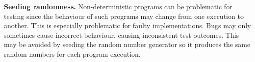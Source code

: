 \textbf{Seeding randomness.}
Non-deterministic programs can be problematic for testing since the behaviour of such programs may change from one execution to another.
This is especially problematic for faulty implementations.
Bugs may only sometimes cause incorrect behaviour, causing inconsistent test outcomes.
This may be avoided by seeding the random number generator so it produces the same random numbers for each program execution.



